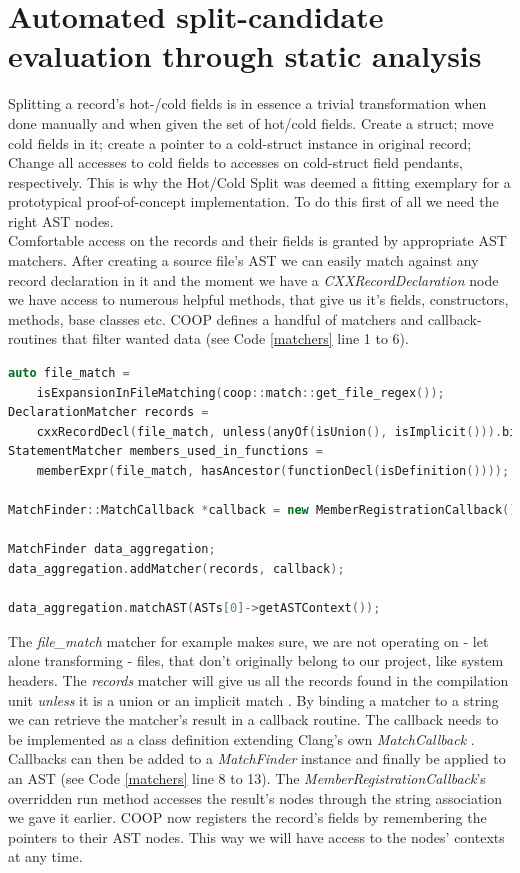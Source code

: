 \section{Automated split-candidate evaluation through static analysis}\label{auto_oop_to_dod}
Splitting a record's hot-/cold fields is in essence a trivial transformation when done manually and when given the set of hot/cold fields. Create a struct; move cold fields in it; create a pointer to a cold-struct instance in original record; Change all accesses to cold fields to accesses on cold-struct field pendants, respectively. This is why the Hot/Cold Split was deemed a fitting exemplary for a prototypical proof-of-concept implementation. To do this first of all we need the right AST nodes.\\
Comfortable access on the records and their fields is granted by appropriate AST matchers. After creating a source file's AST we can easily match against any record declaration in it and the moment we have a \textit{CXXRecordDeclaration} node we have access to numerous helpful methods, that give us it's fields, constructors, methods, base classes etc. COOP defines a handful of matchers and callback-routines that filter wanted data (see Code \ref{matchers} line 1 to 6).
\begin{lstlisting}[language=C++,name={Some matchers used by COOP to filter relevant AST nodes and their utilization },label={matchers}]
auto file_match =
	isExpansionInFileMatching(coop::match::get_file_regex());
DeclarationMatcher records =
	cxxRecordDecl(file_match, unless(anyOf(isUnion(), isImplicit())).bind("record_binding");
StatementMatcher members_used_in_functions =
	memberExpr(file_match, hasAncestor(functionDecl(isDefinition())));

MatchFinder::MatchCallback *callback = new MemberRegistrationCallback();

MatchFinder data_aggregation;
data_aggregation.addMatcher(records, callback);

data_aggregation.matchAST(ASTs[0]->getASTContext());
\end{lstlisting}
The \textit{file\_match} matcher for example makes sure, we are not operating on - let alone transforming - files, that don't originally belong to our project, like system headers. The \textit{records} matcher will give us all the records found in the compilation unit \textit{unless} it is a union or an implicit match . By binding a matcher to a string we can retrieve the matcher's result in a callback routine. The callback needs to be implemented as a class definition extending Clang's own \textit{MatchCallback} . Callbacks can then be added to a \textit{MatchFinder} instance and finally be applied to an AST (see Code \ref{matchers} line 8 to 13). The \textit{MemberRegistrationCallback}'s overridden run method accesses the result's nodes through the string association we gave it earlier. COOP now registers the record's fields by remembering the pointers to their AST nodes. This way we will have access to the nodes' contexts at any time.\\\\
